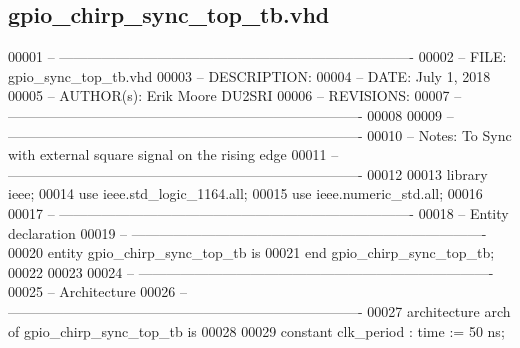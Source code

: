 \subsection{gpio\+\_\+chirp\+\_\+sync\+\_\+top\+\_\+tb.\+vhd}
\label{gpio__chirp__sync__top__tb_8vhd_source}

\begin{DoxyCode}
00001 \textcolor{keyword}{-- ---------------------------------------------------------------------------- }
00002 \textcolor{keyword}{-- FILE:    gpio\_sync\_top\_tb.vhd}
00003 \textcolor{keyword}{-- DESCRIPTION:  }
00004 \textcolor{keyword}{-- DATE:    July 1, 2018}
00005 \textcolor{keyword}{-- AUTHOR(s):   Erik Moore DU2SRI}
00006 \textcolor{keyword}{-- REVISIONS:}
00007 \textcolor{keyword}{-- ---------------------------------------------------------------------------- }
00008 
00009 \textcolor{keyword}{-- ----------------------------------------------------------------------------}
00010 \textcolor{keyword}{-- Notes: To Sync with external square signal on the rising edge}
00011 \textcolor{keyword}{-- ----------------------------------------------------------------------------}
00012 
00013 \textcolor{vhdlkeyword}{library }\textcolor{keywordflow}{ieee};
00014 \textcolor{vhdlkeyword}{use }ieee.std\_logic\_1164.\textcolor{keywordflow}{all};
00015 \textcolor{vhdlkeyword}{use }ieee.numeric\_std.\textcolor{keywordflow}{all};
00016 
00017 \textcolor{keyword}{-- ----------------------------------------------------------------------------}
00018 \textcolor{keyword}{-- Entity declaration}
00019 \textcolor{keyword}{-- ----------------------------------------------------------------------------}
00020 \textcolor{keywordflow}{entity }gpio_chirp_sync_top_tb \textcolor{keywordflow}{is}
00021 \textcolor{keywordflow}{end} \textcolor{vhdlchar}{gpio\_chirp\_sync\_top\_tb};
00022 
00023 
00024 \textcolor{keyword}{-- ----------------------------------------------------------------------------}
00025 \textcolor{keyword}{-- Architecture}
00026 \textcolor{keyword}{-- ----------------------------------------------------------------------------}
00027 \textcolor{keywordflow}{architecture} arch \textcolor{keywordflow}{of} gpio_chirp_sync_top_tb is
00028 
00029     \textcolor{keywordflow}{constant} \textcolor{vhdlchar}{clk_period}     \textcolor{vhdlchar}{:} \textcolor{comment}{time} \textcolor{vhdlchar}{:=} \textcolor{vhdllogic}{}\textcolor{vhdllogic}{50} \textcolor{vhdlchar}{ns};

\end{DoxyCode}
